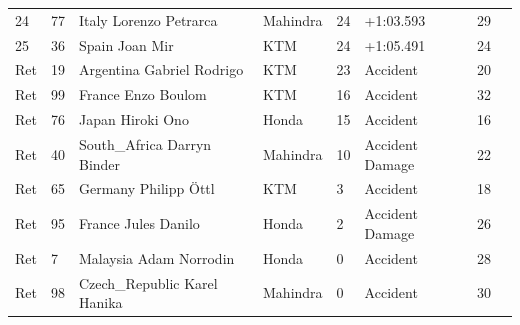\documentclass{article}
\begin{document}
\begin{tabular}{llllllll}
24 & 77 & Italy Lorenzo Petrarca & Mahindra & 24 & +1:03.593 & 29 &  \\
25 & 36 & Spain Joan Mir & KTM & 24 & +1:05.491 & 24 &  \\
Ret & 19 & Argentina Gabriel Rodrigo & KTM & 23 & Accident & 20 &  \\
Ret & 99 & France Enzo Boulom & KTM & 16 & Accident & 32 &  \\
Ret & 76 & Japan Hiroki Ono & Honda & 15 & Accident & 16 &  \\
Ret & 40 & South\_Africa Darryn Binder & Mahindra & 10 & Accident Damage & 22 &  \\
Ret & 65 & Germany Philipp Öttl & KTM & 3 & Accident & 18 &  \\
Ret & 95 & France Jules Danilo & Honda & 2 & Accident Damage & 26 &  \\
Ret & 7 & Malaysia Adam Norrodin & Honda & 0 & Accident & 28 &  \\
Ret & 98 & Czech\_Republic Karel Hanika & Mahindra & 0 & Accident & 30 &  \\
\bottomrule
\end{tabular}
\end{document}
